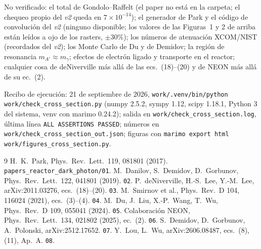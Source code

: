 \documentclass[11pt,a4paper]{article}
\newcommand{\Ap}{A'}
\begin{document}
No verificado: el total de Gondolo--Raffelt (el paper no está en la carpeta; el chequeo propio del \emph{v2} queda en
$7\times10^{-14}$); el generador de Park y el código de convolución del \emph{v2} (ninguno disponible; los valores de las Figuras~1 y 2 de
arriba están leídos a ojo de los rasters, $\pm30\%$); los números de atenuación
XCOM/NIST (recordados del \emph{v2}); los Monte Carlo de Du y de Demidov; la región de resonancia
$m_{\Ap}\approx m_\gamma$; efectos de electrón ligado y transporte en el reactor; cualquier cosa de deNiverville más allá
de las ecs.~(18)--(20) y de NEON más allá de su ec.~(2).

\medskip\noindent\sloppy
Recibo de ejecución: 21 de septiembre de 2026, \texttt{work/.venv/bin/python work/check\_cross\_section.py} (numpy
2.5.2, sympy 1.12, scipy 1.18.1, Python 3 del sistema, venv con marimo 0.24.2); salida en
\texttt{work/check\_cross\_section.log}, última línea \texttt{ALL ASSERTIONS PASSED}; números en
\texttt{work/check\_cross\_section\_out.json}; figuras con \texttt{marimo export html work/figures\_cross\_section.py}.

\begin{thebibliography}{9}\small
{} H.~K.~Park, Phys.\ Rev.\ Lett.\ 119, 081801 (2017). \texttt{papers\_reactor\_dark\_photon/01}.
 M.~Danilov, S.~Demidov, D.~Gorbunov, Phys.\ Rev.\ Lett.\ 122, 041801 (2019). \texttt{02}.
 P.~deNiverville, H.-S.~Lee, Y.-M.~Lee, arXiv:2011.03276, ecs.~(18)--(20). \texttt{03}.
 M.~Smirnov et al., Phys.\ Rev.\ D 104, 116024 (2021), ecs.~(3)--(4). \texttt{04}.
 M.~Du, J.~Liu, X.-P.~Wang, T.~Wu, Phys.\ Rev.\ D 109, 055041 (2024). \texttt{05}.
 Colaboración NEON, Phys.\ Rev.\ Lett.\ 134, 021802 (2025), ec.~(2). \texttt{06}.
 S.~Demidov, D.~Gorbunov, A.~Polonski, arXiv:2512.17652. \texttt{07}.
 Y.~Lou, L.~Wu, arXiv:2606.08487, ecs.~(8), (11), Ap.~A. \texttt{08}.
\end{thebibliography}
\end{document}
